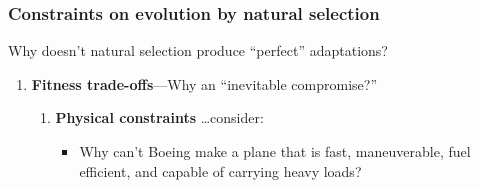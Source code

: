 \begin{noheadline}
\begin{frame}[t]
    \frametitle{Constraints on evolution by natural selection}
    \begin{adjustwidth}{-1.5em}{-1.5em}
        \vspace{-4mm}
        Why doesn't natural selection produce ``perfect'' adaptations?
        
        \begin{enumerate}
            \item \textbf{Fitness trade-offs}---Why an ``inevitable compromise?''
                
                \begin{enumerate}
                    \normalsize
                    \addtocounter{enumii}{1}
                    \item \textbf{Physical constraints} \ldots consider:
                        \begin{itemize}
                        \normalsize
                            \item Why can't Boeing make a plane that is fast,
                                maneuverable, fuel efficient, and capable of
                                carrying heavy loads?
                        \end{itemize}
                \end{enumerate}
        \end{enumerate}
    \end{adjustwidth}
\end{frame}
\end{noheadline}

